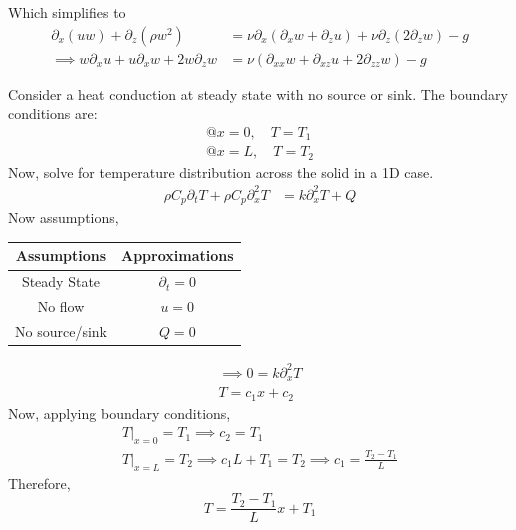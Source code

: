 Which simplifies to 
\begin{align*}
    \partial_{x} (uw) + \partial_{z} (\rho w^2) &= \nu \partial_{x} \left(\partial_{x} w + \partial_{z} u\right) + \nu \partial_{z} \left(2\partial_{z} w\right) - g \\
    \implies w \partial_x u + u \partial_x w + 2 w \partial_z w &= \nu \left(\partial_{xx} w + \partial_{xz} u + 2 \partial_{zz} w\right) - g 
\end{align*}

Consider a heat conduction at steady state with no source or sink. The boundary conditions are:
\begin{align*}
    @ x = 0, \quad T = T_1 \\
    @ x = L, \quad T = T_2
\end{align*}
Now, solve for temperature distribution across the solid in a 1D case.
\begin{align*}
    \rho C_p \partial_t T + \rho C_p \partial_x^2 T &= k \partial_x^2 T
    + Q 
\end{align*}
Now assumptions,
\begin{table}[h]
    \centering
    \begin{tabular}{c|c}
        Assumptions & Approximations \\
        \hline
        Steady State & $\partial_t = 0$ \\
        No flow & $u = 0$ \\
        No source/sink & $Q = 0$ \\
        \end{tabular}
\end{table}
\begin{gather*}
    \implies 0 = k \partial_x^2 T \\
    T = c_1 x + c_2
\end{gather*}
Now, applying boundary conditions, 
\begin{align*}
    T|_{x = 0} = T_1 \implies c_2 = T_1 \\
    T|_{x = L} = T_2 \implies c_1 L + T_1 = T_2 \implies c_1 = \frac{T_2 - T_1}{L}
\end{align*}
Therefore,
\begin{equation*}
    T = \frac{T_2 - T_1}{L}x + T_1
\end{equation*}

